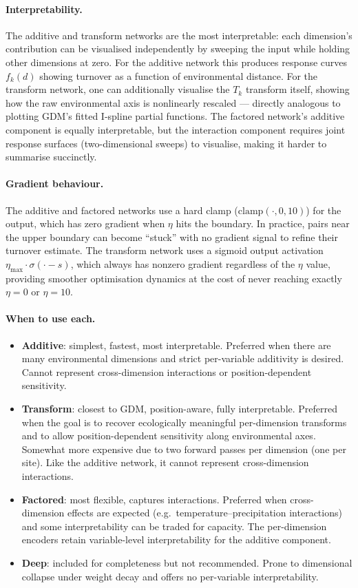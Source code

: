 \documentclass{article}
\begin{document}
\paragraph{Interpretability.}
The additive and transform networks are the most interpretable: each dimension's contribution can be visualised independently by sweeping the input while holding other dimensions at zero. For the additive network this produces response curves $f_k(d)$ showing turnover as a function of environmental distance. For the transform network, one can additionally visualise the $T_k$ transform itself, showing how the raw environmental axis is nonlinearly rescaled --- directly analogous to plotting GDM's fitted I-spline partial functions. The factored network's additive component is equally interpretable, but the interaction component requires joint response surfaces (two-dimensional sweeps) to visualise, making it harder to summarise succinctly.

\paragraph{Gradient behaviour.}
The additive and factored networks use a hard clamp ($\text{clamp}(\cdot, 0, 10)$) for the output, which has zero gradient when $\eta$ hits the boundary. In practice, pairs near the upper boundary can become ``stuck'' with no gradient signal to refine their turnover estimate. The transform network uses a sigmoid output activation $\eta_{\max} \cdot \sigma(\cdot - s)$, which always has nonzero gradient regardless of the $\eta$ value, providing smoother optimisation dynamics at the cost of never reaching exactly $\eta = 0$ or $\eta = 10$.

\paragraph{When to use each.}
\begin{itemize}
    \item \textbf{Additive}: simplest, fastest, most interpretable. Preferred when there are many environmental dimensions and strict per-variable additivity is desired. Cannot represent cross-dimension interactions or position-dependent sensitivity.
    \item \textbf{Transform}: closest to GDM, position-aware, fully interpretable. Preferred when the goal is to recover ecologically meaningful per-dimension transforms and to allow position-dependent sensitivity along environmental axes. Somewhat more expensive due to two forward passes per dimension (one per site). Like the additive network, it cannot represent cross-dimension interactions.
    \item \textbf{Factored}: most flexible, captures interactions. Preferred when cross-dimension effects are expected (e.g.\ temperature--precipitation interactions) and some interpretability can be traded for capacity. The per-dimension encoders retain variable-level interpretability for the additive component.
    \item \textbf{Deep}: included for completeness but not recommended. Prone to dimensional collapse under weight decay and offers no per-variable interpretability.
\end{itemize}
\end{document}
